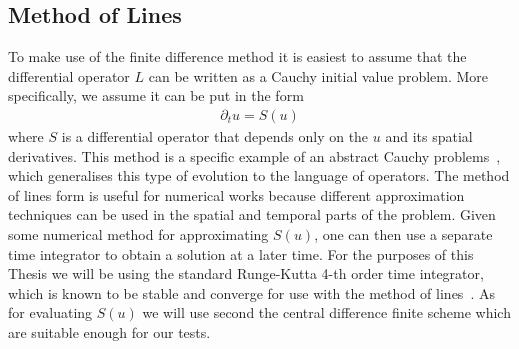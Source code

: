 \documentclass[10pt]{report}
\theoremstyle{definition}
\begin{document}
\subsection{Method of Lines}
To make use of the finite difference method it is easiest to assume that the differential operator $L$ can be written as a Cauchy initial value problem. More specifically, we assume it can be put in the form
\begin{align}
    \partial_t u = S(u)
\end{align}
where $S$ is a differential operator that depends only on the $u$ and its spatial derivatives. This method is a specific example of an abstract Cauchy problems~\cite{Pazy1983}, which generalises this type of evolution to the language of operators. The method of lines form is useful for numerical works because different approximation techniques can be used in the spatial and temporal parts of the problem. Given some numerical method for approximating $S(u)$, one can then use a separate time integrator to obtain a solution at a later time. For the purposes of this Thesis we will be using the standard Runge-Kutta 4-th order time integrator, which is known to be stable and converge for use with the method of lines~\cite{Time_Dependent_Gustaf_2013}. As for evaluating $S(u)$ we will use second the central difference finite scheme which are suitable enough for our tests.
\end{document}
